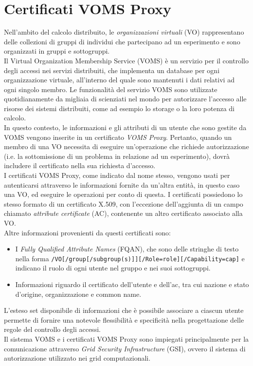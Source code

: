 \section{Certificati VOMS Proxy}
Nell'ambito del calcolo distribuito, le \textit{organizzazioni virtuali} (VO) rappresentano delle collezioni di gruppi 
di individui che partecipano ad un esperimento e sono organizzati in gruppi e sottogruppi. 
\\Il Virtual Organization Membership Service (VOMS) \cite{voms_res_1} è un servizio per il controllo degli accessi 
nei servizi distribuiti, che implementa
un database per ogni organizzazione virtuale, all'interno del
quale sono mantenuti i dati relativi ad ogni singolo membro. Le funzionalità del servizio VOMS sono utilizzate quotidianamente da 
migliaia di scienziati nel mondo per autorizzare l'accesso alle risorse dei sistemi distribuiti, come ad esempio lo storage o la
loro potenza di calcolo. 
\\ In questo contesto, le informazioni e gli attributi di un utente che sono gestite da VOMS vengono inserite in un certificato \textit{VOMS Proxy}.
Pertanto, quando un membro di una VO necessita di eseguire un'operazione che richiede autorizzazione (i.e. la sottomissione di un problema in relazione ad un esperimento), 
dovrà includere il certificato nella sua richiesta d'accesso. 
\\ I certificati VOMS Proxy, come indicato dal nome stesso, vengono usati per autenticarsi attraverso le informazioni fornite da un'altra entità, in questo caso una VO, ed eseguire le operazioni
per conto di questa. I certificati possiedono lo stesso formato di un certificato X.509, con l'eccezione dell'aggiunta di un campo chiamato \textit{attribute certificate} (AC),
 contenente un altro certificato associato alla VO. 
\\ Altre informazioni provenienti da questi certificati sono:
\begin{itemize}
    \item I \textit{Fully Qualified Attribute Names} (FQAN), che sono delle stringhe di testo nella 
    forma \texttt{/VO[/group[/subgroup(s)]][/Role=role][/Capability=cap]} e indicano il ruolo di ogni utente nel gruppo e nei suoi sottogruppi. 
    \item Informazioni riguardo il certificato dell'utente e dell'ac, tra cui nazione e stato d'origine, organizzazione e common name.   
\end{itemize}
L'esteso set disponibile di informazioni che è possibile associare a ciascun utente permette di fornire
 una notevole flessibilità e specificità nella progettazione delle regole del controllo degli accessi. 
 \\ Il sistema VOMS e i certificati VOMS Proxy sono impiegati principalmente per la comunicazione attraverso \textit{Grid Security Infrastructure} (GSI), ovvero 
il sistema di autorizzazione utilizzato nei grid computazionali. 

